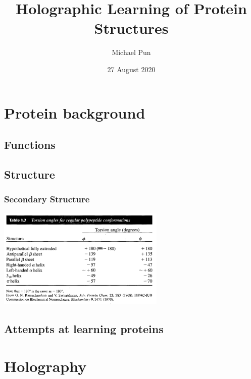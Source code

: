 \documentclass{article}
\title{Holographic Learning of Protein Structures}
\author{Michael Pun}
\date{27 August 2020}
\begin{document}
\maketitle

\tableofcontents

%
%
\section{Protein background}
\subsection{Functions}

\subsection{Structure}

\subsubsection{Secondary Structure}

\includegraphics[width=8cm]{Ramachandran_angle_classification.png}

\subsection{Attempts at learning proteins}


%
%
\section{Holography}
\end{document}
